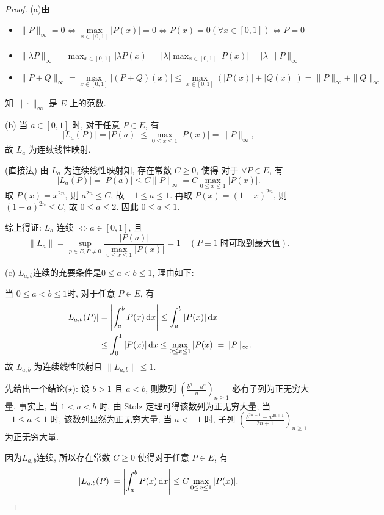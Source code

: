 \begin{proof}
(a)由
\begin{itemize}
    \item $\|P\|_\infty =0\Leftrightarrow\max\limits_{x\in [0,1]}|P(x)|=0\Leftrightarrow P(x)=0(\forall x\in [0,1])\Leftrightarrow P=0$
    \item $\|\lambda P\|_\infty =\max_{x\in [0,1]}|\lambda P(x)|=|\lambda |\max_{x\in [0,1]}|P(x)|=|\lambda|\|P\|_{\infty}$
    \item $\|P+Q\|_{\infty}=\max\limits_{x\in [0,1]}|(P+Q)(x)|\leq\max\limits_{x\in [0,1]}(|P(x)|+|Q(x)|)=\|P\|_{\infty}+\|Q\|_{\infty}$
\end{itemize}
知 $\|\cdot\|_{\infty}$ 是 $E$ 上的范数.

(b)\sufficient 
当 $a\in [0,1]$ 时, 对于任意 $P\in E$, 有
\[|L_a(P)|=|P(a)|\leq\max_{0\leq x\leq 1}|P(x)|=\|P\|_{\infty},\]
故 $L_a$ 为连续线性映射.

\necessary 
(直接法) 由 $L_a$ 为连续线性映射知, 存在常数 $C\geq 0$, 使得
对于 $\forall P\in E$, 有
\[|L_a(P)|=|P(a)|\leq C\|P\|_{\infty}=C\max_{0\leq x\leq 1}|P(x)|.\]
取 $P(x)=x^{2n}$, 则 $a^{2n}\leq C$, 故 $-1\leq a\leq 1$.
再取 $P(x)=(1-x)^{2n}$, 则 $(1-a)^{2n}\leq C$, 故 $0\leq a\leq 2$.
因此 $0\leq a\leq 1$.

综上得证: $L_a$ 连续 $\Leftrightarrow a\in [0,1]$, 且
\[\|L_a\|=\sup\limits_{p\in E,P\neq 0}\frac{|P(a)|}{\max_{0\leq x\leq 1}|P(x)|}=1
  \quad (P\equiv 1\;\text{时可取到最大值}).\]

(c) $L_{a,b}$连续的充要条件是$0\leq a<b\leq 1$, 理由如下:

\sufficient
当 $0\leq a<b\leq 1$时, 对于任意 $P\in E$, 有
\begin{align*}
    |L_{a,b}(P)|
    &=\left\lvert\int_a^b P(x)\mathop{}\!\mathrm{d} x\right\rvert\leq\int_a^b |P(x)|\mathop{}\!\mathrm{d} x \\
    &\leq\int_0^1 |P(x)|\mathop{}\!\mathrm{d} x\leq\max_{0\leq x\leq 1}|P(x)|=\|P\|_{\infty}.
\end{align*}
故 $L_{a,b}$ 为连续线性映射且 $\|L_{a,b}\|\leq 1$.

\necessary
先给出一个结论($\star$):
设 $b>1$ 且 $a<b$, 则数列 $\left(\frac{b^n-a^n}{n}\right)_{n\geq 1}$
必有子列为正无穷大量.
事实上, 当 $1<a<b$ 时, 由 Stolz 定理可得该数列为正无穷大量;
当 $-1\leq a\leq 1$ 时, 该数列显然为正无穷大量;
当 $a<-1$ 时, 子列 $\left(\frac{b^{2n+1}-a^{2n+1}}{2n+1}\right)_{n\geq 1}$
为正无穷大量.

因为$L_{a,b}$连续, 所以存在常数 $C\geq 0$ 使得对于任意 $P\in E$, 有
\[|L_{a,b}(P)|=\left\lvert\int_a^b P(x)\mathop{}\!\mathrm{d} x\right\rvert\leq C\max_{0\leq x\leq 1}|P(x)|.\]


\end{proof}
